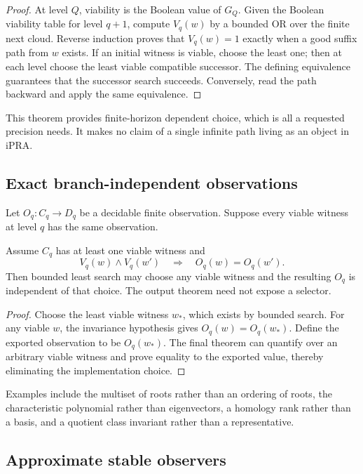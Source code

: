 \begin{proof}
At level \(Q\), viability is the Boolean value of \(G_Q\).  Given the Boolean
viability table for level \(q+1\), compute \(V_q(w)\) by a bounded OR over the
finite next cloud.  Reverse induction proves that \(V_q(w)=1\) exactly when a
good suffix path from \(w\) exists.  If an initial witness is viable, choose the
least one; then at each level choose the least viable compatible successor.
The defining equivalence guarantees that the successor search succeeds.
Conversely, read the path backward and apply the same equivalence.
\end{proof}

This theorem provides finite-horizon dependent choice, which is all a requested
precision needs.  It makes no claim of a single infinite path living as an
object in iPRA.

\subsection{Exact branch-independent observations}

Let \(O_q:C_q\to D_q\) be a decidable finite observation.  Suppose every viable
witness at level \(q\) has the same observation.

\begin{theorem}\label{thm:exact-observer}
Assume \(C_q\) has at least one viable witness and
\[
    V_q(w)\wedge V_q(w')\quad\Longrightarrow\quad O_q(w)=O_q(w').
\]
Then bounded least search may choose any viable witness and the resulting
\(O_q\) is independent of that choice.  The output theorem need not expose a
selector.
\end{theorem}

\begin{proof}
Choose the least viable witness \(w_*\), which exists by bounded search.  For
any viable \(w\), the invariance hypothesis gives \(O_q(w)=O_q(w_*)\).  Define
the exported observation to be \(O_q(w_*)\).  The final theorem can quantify
over an arbitrary viable witness and prove equality to the exported value,
thereby eliminating the implementation choice.
\end{proof}

Examples include the multiset of roots rather than an ordering of roots, the
characteristic polynomial rather than eigenvectors, a homology rank rather than
a basis, and a quotient class invariant rather than a representative.

\subsection{Approximate stable observers}

